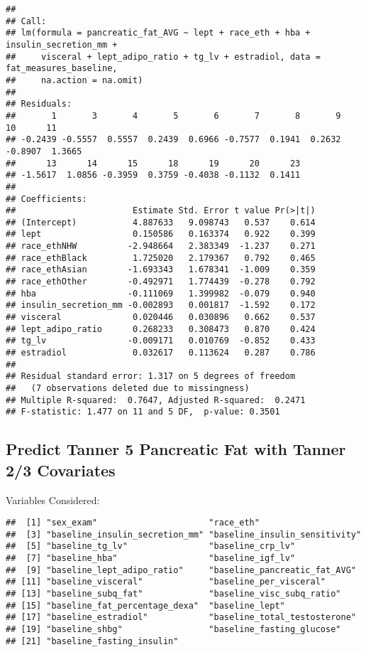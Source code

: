 \documentclass[
]{article}
\begin{document}
\begin{verbatim}
## 
## Call:
## lm(formula = pancreatic_fat_AVG ~ lept + race_eth + hba + insulin_secretion_mm + 
##     visceral + lept_adipo_ratio + tg_lv + estradiol, data = fat_measures_baseline, 
##     na.action = na.omit)
## 
## Residuals:
##       1       3       4       5       6       7       8       9      10      11 
## -0.2439 -0.5557  0.5557  0.2439  0.6966 -0.7577  0.1941  0.2632 -0.8907  1.3665 
##      13      14      15      18      19      20      23 
## -1.5617  1.0856 -0.3959  0.3759 -0.4038 -0.1132  0.1411 
## 
## Coefficients:
##                       Estimate Std. Error t value Pr(>|t|)
## (Intercept)           4.887633   9.098743   0.537    0.614
## lept                  0.150586   0.163374   0.922    0.399
## race_ethNHW          -2.948664   2.383349  -1.237    0.271
## race_ethBlack         1.725020   2.179367   0.792    0.465
## race_ethAsian        -1.693343   1.678341  -1.009    0.359
## race_ethOther        -0.492971   1.774439  -0.278    0.792
## hba                  -0.111069   1.399982  -0.079    0.940
## insulin_secretion_mm -0.002893   0.001817  -1.592    0.172
## visceral              0.020446   0.030896   0.662    0.537
## lept_adipo_ratio      0.268233   0.308473   0.870    0.424
## tg_lv                -0.009171   0.010769  -0.852    0.433
## estradiol             0.032617   0.113624   0.287    0.786
## 
## Residual standard error: 1.317 on 5 degrees of freedom
##   (7 observations deleted due to missingness)
## Multiple R-squared:  0.7647, Adjusted R-squared:  0.2471 
## F-statistic: 1.477 on 11 and 5 DF,  p-value: 0.3501
\end{verbatim}

\hypertarget{predict-tanner-5-pancreatic-fat-with-tanner-23-covariates}{%
\subsection{Predict Tanner 5 Pancreatic Fat with Tanner 2/3
Covariates}\label{predict-tanner-5-pancreatic-fat-with-tanner-23-covariates}}

Variables Considered:

\begin{verbatim}
##  [1] "sex_exam"                      "race_eth"                     
##  [3] "baseline_insulin_secretion_mm" "baseline_insulin_sensitivity" 
##  [5] "baseline_tg_lv"                "baseline_crp_lv"              
##  [7] "baseline_hba"                  "baseline_igf_lv"              
##  [9] "baseline_lept_adipo_ratio"     "baseline_pancreatic_fat_AVG"  
## [11] "baseline_visceral"             "baseline_per_visceral"        
## [13] "baseline_subq_fat"             "baseline_visc_subq_ratio"     
## [15] "baseline_fat_percentage_dexa"  "baseline_lept"                
## [17] "baseline_estradiol"            "baseline_total_testosterone"  
## [19] "baseline_shbg"                 "baseline_fasting_glucose"     
## [21] "baseline_fasting_insulin"
\end{verbatim}
\end{document}
